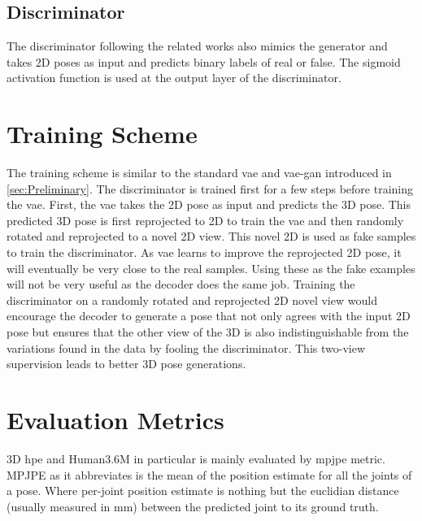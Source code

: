 \subsection{Discriminator}%
The discriminator following the related works also mimics the generator and takes 2D poses as input and predicts binary labels of real or false. The sigmoid activation function is used at the output layer of the discriminator.


\section{Training Scheme}
The training scheme is similar to the standard \ac{vae} and \ac{vae}-\ac{gan} introduced in \ref{sec:Preliminary}. The discriminator is trained first for a few steps before training the \ac{vae}. First, the \ac{vae} takes the 2D pose as input and predicts the 3D pose. This predicted 3D pose is first reprojected to 2D to train the \ac{vae} and then randomly rotated and reprojected to a novel 2D view. This novel 2D is used as fake samples to train the discriminator. As \ac{vae} learns to improve the reprojected 2D pose, it will eventually be very close to the real samples. Using these as the fake examples will not be very useful as the decoder does the same job. Training the discriminator on a randomly rotated and reprojected 2D novel view would encourage the decoder to generate a pose that not only agrees with the input 2D pose but ensures that the other view of the 3D is also indistinguishable from the variations found in the data by fooling the discriminator. This two-view supervision leads to better 3D pose generations.

\section{Evaluation Metrics} %
3D \ac{hpe} and Human3.6M in particular is mainly evaluated by \ac{mpjpe} metric. MPJPE as it abbreviates is the mean of the position estimate for all the joints of a pose. Where per-joint position estimate is nothing but the euclidian distance (usually measured in mm) between the predicted joint to its ground truth.


